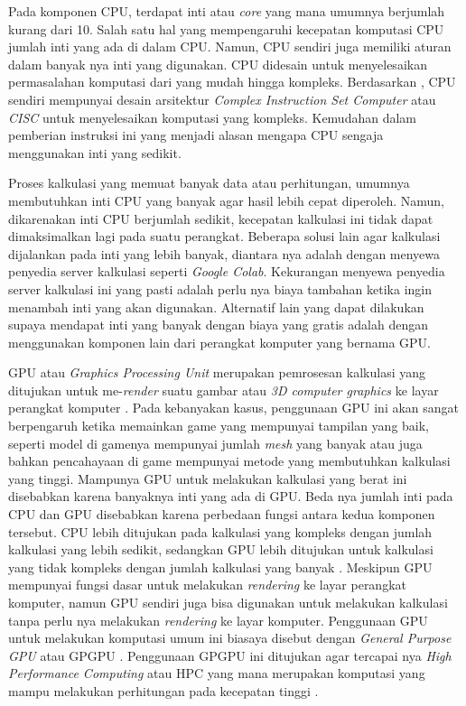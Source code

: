 
Pada komponen CPU, terdapat inti atau \emph{core} yang mana umumnya berjumlah
kurang dari 10. Salah satu hal yang mempengaruhi kecepatan komputasi CPU jumlah inti yang ada di dalam CPU. Namun, CPU sendiri juga memiliki aturan dalam banyak
nya inti yang digunakan. CPU didesain untuk menyelesaikan permasalahan
komputasi dari yang mudah hingga kompleks. Berdasarkan
\cite{kukunasChapterIntelPentium2015}, CPU sendiri mempunyai desain arsitektur
\emph{Complex Instruction Set Computer} atau \emph{CISC} untuk menyelesaikan komputasi
yang kompleks. Kemudahan dalam pemberian instruksi ini yang menjadi alasan
mengapa CPU sengaja menggunakan inti yang sedikit.

Proses kalkulasi yang memuat banyak data atau perhitungan, umumnya membutuhkan
inti CPU yang banyak agar hasil lebih cepat diperoleh. Namun, dikarenakan inti
CPU berjumlah sedikit, kecepatan kalkulasi ini tidak dapat dimaksimalkan lagi
pada suatu perangkat. Beberapa solusi lain agar kalkulasi dijalankan pada inti
yang lebih banyak, diantara nya adalah dengan menyewa penyedia server kalkulasi
seperti \emph{Google Colab}. Kekurangan menyewa penyedia server kalkulasi ini
yang pasti adalah perlu nya biaya tambahan ketika ingin menambah inti yang akan
digunakan. Alternatif lain yang dapat dilakukan supaya mendapat inti yang
banyak dengan biaya yang gratis adalah dengan menggunakan komponen lain dari
perangkat komputer yang bernama GPU.


GPU atau \emph{Graphics Processing Unit} merupakan pemrosesan kalkulasi yang
ditujukan untuk me-\emph{render} suatu gambar atau \emph{3D computer graphics}
ke layar perangkat komputer \citep{armWhatGraphicsProcessing2023}. Pada
kebanyakan kasus, penggunaan GPU ini akan sangat berpengaruh ketika memainkan
game yang mempunyai tampilan yang baik, seperti model di gamenya mempunyai
jumlah \emph{mesh} yang banyak atau juga bahkan pencahayaan di game mempunyai
metode yang membutuhkan kalkulasi yang tinggi. Mampunya GPU untuk melakukan
kalkulasi yang berat ini disebabkan karena banyaknya inti yang ada di GPU. Beda
nya jumlah inti pada CPU dan GPU disebabkan karena perbedaan fungsi antara
kedua komponen tersebut. CPU lebih ditujukan pada kalkulasi yang kompleks
dengan jumlah kalkulasi yang lebih sedikit, sedangkan GPU lebih ditujukan untuk
kalkulasi yang tidak kompleks dengan jumlah kalkulasi yang banyak
\citep{intelCPUVsGPU2023}. Meskipun GPU mempunyai fungsi dasar untuk melakukan
\emph{rendering} ke layar perangkat komputer, namun GPU sendiri juga bisa
digunakan untuk melakukan kalkulasi tanpa perlu nya melakukan \emph{rendering}
ke layar komputer. Penggunaan GPU untuk melakukan komputasi umum ini biasaya
disebut dengan \emph{General Purpose GPU} atau GPGPU
\citep{gigabyteWhatGPGPUWhy2023}. Penggunaan GPGPU ini ditujukan agar tercapai
nya \emph{High Performance Computing} atau HPC yang mana merupakan komputasi
yang mampu melakukan perhitungan pada kecepatan tinggi
\citep{gigabyteHPCHighPerformance2023}.

